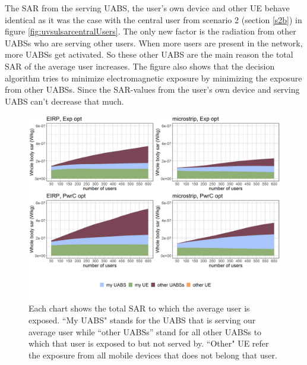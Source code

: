 The \gls{SAR} from the serving UABS, the user's own device and other \gls{UE} behave identical as it was the case with the central user from scenario 2 (section \ref{s2b}) 
in figure \ref{fig:uvsulsarcentralUsers}. The only new factor is the radiation from other \gls{UABS}s who are serving other users. When more users 
are present in the network, more \gls{UABS}s get activated. So these other \gls{UABS} are the main reason the total \gls{SAR} of the average user increases.
The figure also shows that the decision algorithm tries to minimize electromagnetic exposure by minimizing the exposure from other \gls{UABS}s. Since the \gls{SAR}-values
from the user's own device and serving \gls{UABS} can't decrease that much.

\begin{figure}[h!]
  \includegraphics[width=\textwidth]{../results/s3/uFourSources.png}
  \caption{Each chart shows the total SAR to which the average user is exposed. ``My UABS" stands for the UABS that is serving our average user while ``other UABSs'' stand for 
  all other UABSs to which that user is exposed to but not served by. ``Other" UE refer the exposure from all mobile devices that does not belong that user.}
  \label{fig:s3b_fourSourcesMatrix}
\end{figure}